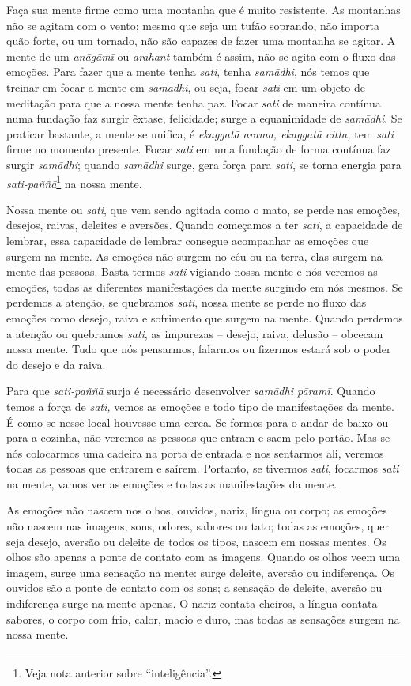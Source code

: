 Faça sua mente firme como uma montanha que é muito resistente. As
montanhas não se agitam com o vento; mesmo que seja um tufão soprando,
não importa quão forte, ou um tornado, não são capazes de fazer uma
montanha se agitar. A mente de um \textit{anāgāmī} ou
\textit{arahant} também é assim, não se agita com o fluxo das emoções.
Para fazer que a mente tenha \textit{sati}, tenha \textit{samādhi},
nós temos que treinar em focar a mente em \textit{samādhi}, ou seja,
focar \textit{sati} em um objeto de meditação para que a nossa mente
tenha paz. Focar \textit{sati }de maneira contínua numa fundação faz
surgir êxtase, felicidade; surge a equanimidade de \textit{samādhi}.
Se praticar bastante, a mente se unifica, é \textit{ekaggatā arama,
ekaggatā citta,} tem \textit{sati }firme no momento presente. Focar
\textit{sati }em uma fundação de forma contínua faz surgir
\textit{samādhi}; quando \textit{samādhi }surge, gera força para
\textit{sati}, se torna energia para
\textit{sati-paññā}\footnote{Veja nota anterior sobre
“inteligência”.} na nossa mente.

Nossa mente ou \textit{sati}, que vem sendo agitada como o mato, se
perde nas emoções, desejos, raivas, deleites e aversões. Quando
começamos a ter \textit{sati}, a capacidade de lembrar, essa capacidade
de lembrar consegue acompanhar as emoções que surgem na mente. As
emoções não surgem no céu ou na terra, elas surgem na mente das
pessoas. Basta termos \textit{sati }vigiando nossa mente e nós veremos
as emoções, todas as diferentes manifestações da mente surgindo em nós
mesmos. Se perdemos a atenção, se quebramos \textit{sati}, nossa mente
se perde no fluxo das emoções como desejo, raiva e sofrimento que
surgem na mente. Quando perdemos a atenção ou quebramos \textit{sati},
as impurezas – desejo, raiva, delusão – obcecam nossa mente. Tudo que
nós pensarmos, falarmos ou fizermos estará sob o poder do desejo e da
raiva.

Para que \textit{sati-paññā }surja é necessário desenvolver
\textit{samādhi pāramī}. Quando temos a força de \textit{sati,}
vemos as emoções e todo tipo de manifestações da mente. É como se nesse
local houvesse uma cerca. Se formos para o andar de baixo ou para a
cozinha, não veremos as pessoas que entram e saem pelo portão. Mas se
nós colocarmos uma cadeira na porta de entrada e nos sentarmos ali,
veremos todas as pessoas que entrarem e saírem. Portanto, se tivermos
\textit{sati}, focarmos \textit{sati }na mente, vamos ver as emoções e
todas as manifestações da mente.

As emoções não nascem nos olhos, ouvidos, nariz, língua ou corpo; as
emoções não nascem nas imagens, sons, odores, sabores ou tato; todas as
emoções, quer seja desejo, aversão ou deleite de todos os tipos, nascem
em nossas mentes. Os olhos são apenas a ponte de contato com as
imagens. Quando os olhos veem uma imagem, surge uma sensação na mente:
surge deleite, aversão ou indiferença. Os ouvidos são a ponte de
contato com os sons; a sensação de deleite, aversão ou indiferença
surge na mente apenas. O nariz contata cheiros, a língua contata
sabores, o corpo com frio, calor, macio e duro, mas todas as sensações
surgem na nossa mente.

